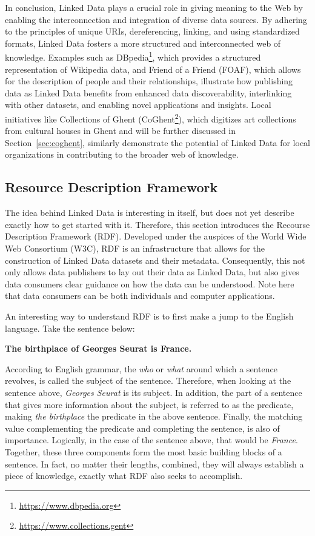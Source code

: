 In conclusion, Linked Data plays a crucial role in giving meaning to the Web by enabling the interconnection and integration of diverse data sources. By adhering to the principles of unique URIs, dereferencing, linking, and using standardized formats, Linked Data fosters a more structured and interconnected web of knowledge. Examples such as DBpedia\footnote{\url{https://www.dbpedia.org}}, which provides a structured representation of Wikipedia data, and Friend of a Friend (FOAF), which allows for the description of people and their relationships, illustrate how publishing data as Linked Data benefits from enhanced data discoverability, interlinking with other datasets, and enabling novel applications and insights. Local initiatives like Collections of Ghent (CoGhent\footnote{\url{https://www.collections.gent}}), which digitizes art collections from cultural houses in Ghent and will be further discussed in Section~\ref{sec:coghent}, similarly demonstrate the potential of Linked Data for local organizations in contributing to the broader web of knowledge. \citep{auer2007dbpedia} \citep{golbeck2008linking} \citep{van2022publishing}

\subsection{Resource Description Framework}
\label{subsec:rdf}

The idea behind Linked Data is interesting in itself, but does not yet describe exactly how to get started with it. Therefore, this section introduces the Recourse Description Framework (RDF). Developed under the auspices of the World Wide Web Consortium (W3C), RDF is an infrastructure that allows for the construction of Linked Data datasets and their metadata. Consequently, this not only allows data publishers to lay out their data as Linked Data, but also gives data consumers clear guidance on how the data can be understood. Note here that data consumers can be both individuals and computer applications. \citep{miller1998introduction}

An interesting way to understand RDF is to first make a jump to the English language. Take the sentence below:
\begin{center}
    \textbf{The birthplace of Georges Seurat is France.}
\end{center}
According to English grammar, the \textit{who} or \textit{what} around which a sentence revolves, is called the subject of the sentence. Therefore, when looking at the sentence above, \textit{Georges Seurat} is its subject. In addition, the part of a sentence that gives more information about the subject, is referred to as the predicate, making \textit{the birthplace} the predicate in the above sentence. Finally, the matching value complementing the predicate and completing the sentence, is also of importance. Logically, in the case of the sentence above, that would be \textit{France}. Together, these three components form the most basic building blocks of a sentence. In fact, no matter their lengths, combined, they will always establish a piece of knowledge, exactly what RDF also seeks to accomplish. \citep{powers2003practical}

